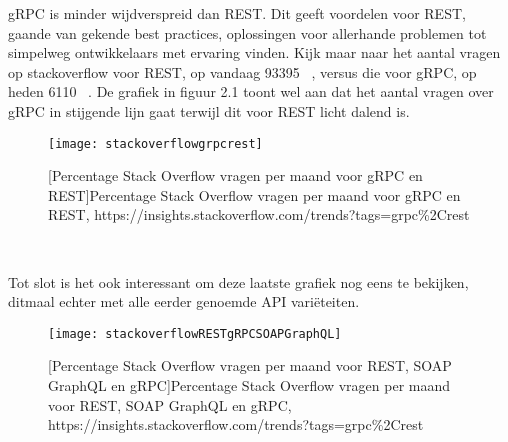 gRPC is minder wijdverspreid dan REST. Dit geeft voordelen voor REST, gaande van gekende best practices, oplossingen voor allerhande problemen
tot simpelweg ontwikkelaars met ervaring vinden. Kijk maar naar het aantal vragen op stackoverflow voor REST, op vandaag 93395 ~\parencite{stackrest},
versus die voor gRPC, op heden 6110 ~\parencite{stackgrpc}. De grafiek in figuur 2.1 toont wel aan dat het aantal vragen over gRPC in stijgende lijn gaat terwijl
dit voor REST licht dalend is.
\begin{figure}[ht]
    \centering
    \texttt{[image: stackoverflowgrpcrest]}
    \caption{[Percentage Stack Overflow vragen per maand voor gRPC en REST]Percentage Stack Overflow vragen per maand voor gRPC en REST,\newline
        https://insights.stackoverflow.com/trends?tags=grpc\%2Crest}
\end{figure}\\
\nocite{stackoverflowRESTgRPC}

Tot slot is het ook interessant om deze laatste grafiek nog eens te bekijken, ditmaal echter met alle eerder genoemde API vari\"eteiten.

\begin{figure}[ht]
    \centering
    \texttt{[image: stackoverflowRESTgRPCSOAPGraphQL]}
    \caption{[Percentage Stack Overflow vragen per maand voor REST, SOAP GraphQL en gRPC]Percentage Stack Overflow vragen per maand voor REST, SOAP GraphQL en gRPC,\newline
    https://insights.stackoverflow.com/trends?tags=grpc\%2Crest}
\end{figure}\\
\nocite{stackoverflowRESTgRPCSOAPGraphQL}


